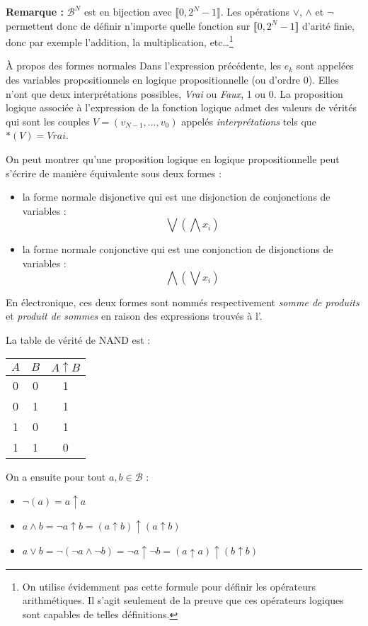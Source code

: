 \documentclass[../main.tex]{subfiles}
\begin{document}
\textbf{Remarque : }$\mathcal{B}^{N}$ est en bijection avec $\llbracket 0, 2^{N}-1\rrbracket$. Les opérations $\vee$, $\wedge$ et $\neg$ permettent donc de définir n'importe quelle fonction sur $\llbracket 0, 2^{N}-1\rrbracket$ d'arité finie, donc par exemple l'addition, la multiplication, etc\dots\footnote{On utilise évidemment pas cette formule pour définir les opérateurs arithmétiques. Il s'agit seulement de la preuve que ces opérateurs logiques sont capables de telles définitions.}
\begin{minitelbasicbox}{À propos des formes normales}
Dans l'expression précédente, les $e_{k}$ sont appelées des variables propositionnels en logique propositionnelle (ou d'ordre 0). Elles n'ont que deux interprétations possibles, \textit{Vrai} ou \textit{Faux}, 1 ou 0. La proposition logique associée à l'expression de la fonction logique admet des valeurs de vérités qui sont les couples $V = (v_{N-1}, \dots, v_{0})$ appelés \textit{interprétations} tels que $\ast(V) = Vrai$.

On peut montrer qu'une proposition logique en logique propositionnelle peut s'écrire de manière équivalente sous deux formes :
\begin{itemize}
	\item la forme normale disjonctive qui est une disjonction de conjonctions de variables :
	$$\displaystyle\bigvee\left(\displaystyle\bigwedge x_{i}\right)$$
	\item la forme normale conjonctive qui est une conjonction de disjonctions de variables :
	$$\displaystyle\bigwedge\left(\displaystyle\bigvee x_{i}\right)$$
\end{itemize}
En électronique, ces deux formes sont nommés respectivement \textit{somme de produits} et \textit{produit de sommes} en raison des expressions trouvés à l'.
\end{minitelbasicbox}
La table de vérité de NAND est :
\begin{center}
\begin{tabular}{c|c|c}
$A$ & $B$ & $A\uparrow{B}$ \\
\hline
0 & 0 & 1 \\
0 & 1 & 1 \\
1 & 0 & 1 \\
1 & 1 & 0 \\
\end{tabular}
\end{center}
On a ensuite pour tout $a, b\in{\mathcal{B}}$ :
\begin{itemize}
	\item $\neg(a) = a\uparrow{a}$
	\item $a\wedge b = \neg{a\uparrow{b}} = (a\uparrow{b})\uparrow(a\uparrow{b})$
	\item $a\vee b = \neg{(\neg a \wedge \neg{b})} = \neg{a}\uparrow\neg{b} = (a\uparrow a) \uparrow (b\uparrow b)$
\end{itemize}
\end{document}
